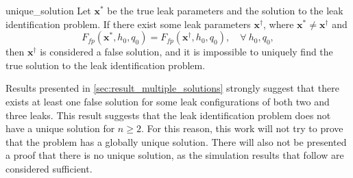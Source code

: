 \begin{lemma}{}{unique_solution}
Let $\mathbf{x}^*$ be the true leak parameters and the solution to the leak identification problem. If there exist some leak parameters $\mathbf{x}^\dagger$, where $\mathbf{x}^* \ne \mathbf{x}^\dagger$ and 
\begin{equation*}
    F_{fp}(\mathbf{x}^*, h_0,q_0) = F_{fp}(\mathbf{x}^\dagger, h_0,q_0),\quad \forall \ h_0,q_0,
\end{equation*}
then $\mathbf{x}^\dagger$ is considered a false solution, and it is impossible to uniquely find the true solution to the leak identification problem.
\end{lemma}

Results presented in \autoref{sec:result_multiple_solutions} strongly suggest that there exists at least one false solution for some leak configurations of both two and three leaks. 
This result suggests that the leak identification problem does not have a unique solution for $n \geq 2$. For this reason, this work will not try to prove that the problem has a globally unique solution. There will also not be presented a proof that there is no unique solution, as the simulation results that follow are considered sufficient.
